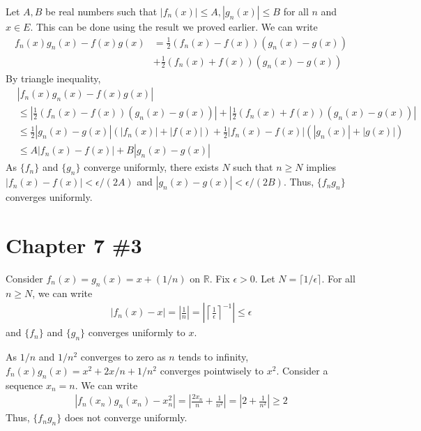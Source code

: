 \documentclass{scrartcl}
\begin{document}
Let \(A, B\) be real numbers such that \(|f_n(x)| \leq A, |g_n(x)| \leq B\)
for all \(n\) and \(x \in E\). This can be done using the result we proved
earlier. We can write
\begin{align*}
  f_n(x) g_n(x) - f(x) g(x)
  &= \frac{1}{2} (f_n(x) - f(x))(g_n(x) - g(x)) \\
  &+ \frac{1}{2} (f_n(x) + f(x)) (g_n(x) - g(x))
\end{align*}
By triangle inequality,
\begin{align*}
  &|f_n(x) g_n(x) - f(x) g(x)| \\
  &\leq \left|\frac{1}{2} (f_n(x) - f(x))(g_n(x) - g(x)) \right|
  + \left| \frac{1}{2} (f_n(x) + f(x)) (g_n(x) - g(x)) \right| \\
  &\leq \frac{1}{2} |g_n(x) - g(x)| (|f_n(x)| + |f(x)|)
  + \frac{1}{2} |f_n(x) - f(x)| (|g_n(x)| + |g(x)|) \\
  &\leq A|f_n(x) - f(x)| + B|g_n(x) - g(x)|
\end{align*}
As \(\{f_n\}\) and \(\{g_n\}\) converge uniformly, there exists \(N\) such that
\(n \geq N\) implies \(|f_n(x) - f(x)| < \epsilon / (2A)\) and \(|g_n(x) -
g(x)| < \epsilon / (2B)\). Thus, \(\{f_n g_n\}\) converges uniformly.

\section{Chapter 7 \#3}
Consider \(f_n(x) = g_n(x) = x + (1 / n)\) on \(\mathbb{R}\). Fix \(\epsilon >
0\). Let \(N = \lceil 1 / \epsilon \rceil\). For all \(n \geq N\), we can write
\begin{align*}
  |f_n(x) - x| = \left| \frac{1}{n} \right|
  = \left| \left\lceil \frac{1}{\epsilon} \right\rceil^{-1} \right|
  \leq \epsilon
\end{align*}
and \(\{f_n\}\) and \(\{g_n\}\) converges uniformly to \(x\).

As \(1 / n\) and \(1 / n^2\) converges to zero as \(n\) tends to infinity,
\(f_n(x) g_n(x) = x^2 + 2x / n + 1 / n^2\) converges pointwisely to \(x^2\).
Consider a sequence \(x_n = n\). We can write
\begin{align*}
  |f_n(x_n) g_n(x_n) - x_n^2| = \left| \frac{2x_n}{n} + \frac{1}{n^2} \right|
  = \left| 2 + \frac{1}{n^2} \right| \geq 2
\end{align*}
Thus, \(\{f_n g_n\}\) does not converge uniformly.
\end{document}
